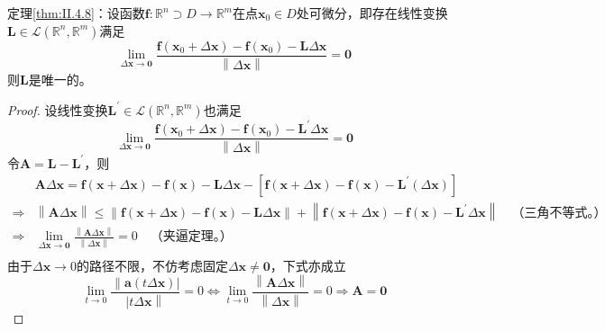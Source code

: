 \documentclass[main.tex]{subfiles}
\begin{document}
\begin{theorem*}[必要条件之唯一性]
    定理\ref{thm:II.4.8}：设函数$\mathbf{f}:\mathbb{R}^n\supset D\rightarrow\mathbb{R}^m$在点$\mathbf{x}_0\in D$处可微分，即存在线性变换$\mathbf{L}\in\mathcal{L}\left(\mathbb{R}^n,\mathbb{R}^m\right)$满足
    \[
        \lim_{\Delta\mathbf{x}\to\mathbf{0}}\frac{\mathbf{f}\left(\mathbf{x}_0+\Delta \mathbf{x}\right)-\mathbf{f}\left(\mathbf{x}_0\right)-\mathbf{L}\Delta\mathbf{x}}{\left\|\Delta\mathbf{x}\right\|}=\mathbf{0}
    \]
    则$\mathbf{L}$是唯一的。
\end{theorem*}
\begin{proof}
    设线性变换$\mathbf{L}^\prime\in\mathcal{L}\left(\mathbb{R}^n,\mathbb{R}^m\right)$也满足
    \[
        \lim_{\Delta\mathbf{x}\to\mathbf{0}}\frac{\mathbf{f}\left(\mathbf{x}_0+\Delta \mathbf{x}\right)-\mathbf{f}\left(\mathbf{x}_0\right)-\mathbf{L}^\prime\Delta\mathbf{x}}{\left\|\Delta\mathbf{x}\right\|}=\mathbf{0}
    \]
    令$\mathbf{A}=\mathbf{L}-\mathbf{L}^\prime$，则
    \begin{align*}
                    & \mathbf{A}\Delta\mathbf{x}=\mathbf{f}\left(\mathbf{x}+\Delta\mathbf{x}\right)-\mathbf{f}\left(\mathbf{x}\right)-\mathbf{L}\Delta\mathbf{x}-\left[\mathbf{f}\left(\mathbf{x}+\Delta\mathbf{x}\right)-\mathbf{f}\left(\mathbf{x}\right)-\mathbf{L}^\prime\left(\Delta\mathbf{x}\right)\right]                                           \\
        \Rightarrow & \left\|\mathbf{A}\Delta\mathbf{x}\right\|\leq\left\|\mathbf{f}\left(\mathbf{x}+\Delta\mathbf{x}\right)-\mathbf{f}\left(\mathbf{x}\right)-\mathbf{L}\Delta\mathbf{x}\right\|+\left\|\mathbf{f}\left(\mathbf{x}+\Delta\mathbf{x}\right)-\mathbf{f}\left(\mathbf{x}\right)-\mathbf{L}^\prime\Delta\mathbf{x}\right\|\quad\text{（三角不等式。）} \\
        \Rightarrow & \lim_{\Delta\mathbf{x}\to\mathbf{0}}\frac{\left\|\mathbf{A}\Delta\mathbf{x}\right\|}{\left\|\Delta\mathbf{x}\right\|}=0\quad\text{（夹逼定理。）}                                                                                                                                                                                            \\
    \end{align*}
    由于$\Delta\mathbf{x}\to0$的路径不限，不仿考虑固定$\Delta\mathbf{x}\neq\mathbf{0}$，下式亦成立
    \[\lim_{t\to0}\frac{\left\|\mathbf{a}\left(t\Delta\mathbf{x}\right)\right|}{\left|t\Delta\mathbf{x}\right\|}=0\Leftrightarrow\lim_{t\to0}\frac{\left\|\mathbf{A}\Delta\mathbf{x}\right\|}{\left\|\Delta\mathbf{x}\right\|}=0\Rightarrow\mathbf{A}=\mathbf{0}\]
\end{proof}
\end{document}
